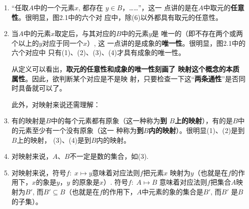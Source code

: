 \begin{figure}[htp]
    \caption{}
\end{figure}



\begin{note}
\begin{enumerate}
    \item “任取$A$中的一个元素$x$, 都存在
$y\in B$，……”，这一
点讲的是在$A$中取元的\textbf{任意性}。很明显，图2.1中的六个对
应中，除(6)以外都具有取元的任意性。
\item 当$A$中的元素$x$取定后，与其对应的$B$中的元素$y$是
唯一的（即不存在两个或两个以上的$y$对应于同一个$x$）, 这
一点讲的是成象的\textbf{唯一性}。很明显，图2.1中的六个对应中
只有(1)、(2)、(3)、(4)才具有成象的唯一性。

从定义可以看出，\textbf{取元的任意性和成象的唯一性刻画了
映射这个概念的本质属性}。因此，欲判断某个对应是不是映
射，只要检查一下这“\textbf{两条通性}”是否同时具备就可以了。

此外，对映射来说还需理解：

\item 有的映射是$B$中的每个元素都有原象（这一种称为\textbf{到
$B$上的映射}），有的是$B$中的元素至少有一个没有原象（这一
种称为\textbf{到$B$内的映射}）。很明显(1)、(2)是到$B$上的映射，
(3)、(4)是到$B$内的映射。
\item 对映射来说，$A$、$B$不一定是数的集合，如(3).
\item 对映射来说，符号$f:\; x\mapsto  y$意味着对应法则$f$把元素$x$
映射为$y$（也就是在$f$的作用下，$x$的象是$y$，$y$
的原象是$x$）. 符号$f:\; A\mapsto  B$
意味着对应法则$f$把集合$A$映射为$B'$, 而$B'\subseteq B$（也就是在$f$的作用下，$A$中元素的象的集合是$B'$, 而$B'$
是$B$的子集）。
\end{enumerate}
\end{note}    



